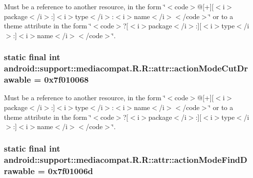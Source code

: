 Must be a reference to another resource, in the form \char`\"{}$<$code$>$@\mbox{[}+\mbox{]}\mbox{[}$<$i$>$package$<$/i$>$:\mbox{]}$<$i$>$type$<$/i$>$:$<$i$>$name$<$/i$>$$<$/code$>$\char`\"{} or to a theme attribute in the form \char`\"{}$<$code$>$?\mbox{[}$<$i$>$package$<$/i$>$:\mbox{]}\mbox{[}$<$i$>$type$<$/i$>$:\mbox{]}$<$i$>$name$<$/i$>$$<$/code$>$\char`\"{}. \hypertarget{classandroid_1_1support_1_1mediacompat_1_1_r_1_1attr_c84b89a7b1f006d64b94f870234ef536}{
\subsubsection[{actionModeCutDrawable}]{\setlength{\rightskip}{0pt plus 5cm}static final int android::support::mediacompat.R.R::attr::actionModeCutDrawable = 0x7f010068}}
\label{classandroid_1_1support_1_1mediacompat_1_1_r_1_1attr_c84b89a7b1f006d64b94f870234ef536}


Must be a reference to another resource, in the form \char`\"{}$<$code$>$@\mbox{[}+\mbox{]}\mbox{[}$<$i$>$package$<$/i$>$:\mbox{]}$<$i$>$type$<$/i$>$:$<$i$>$name$<$/i$>$$<$/code$>$\char`\"{} or to a theme attribute in the form \char`\"{}$<$code$>$?\mbox{[}$<$i$>$package$<$/i$>$:\mbox{]}\mbox{[}$<$i$>$type$<$/i$>$:\mbox{]}$<$i$>$name$<$/i$>$$<$/code$>$\char`\"{}. \hypertarget{classandroid_1_1support_1_1mediacompat_1_1_r_1_1attr_64edbc30b4e2a7a8e3e6337fba3a3924}{
\subsubsection[{actionModeFindDrawable}]{\setlength{\rightskip}{0pt plus 5cm}static final int android::support::mediacompat.R.R::attr::actionModeFindDrawable = 0x7f01006d}}
\label{classandroid_1_1support_1_1mediacompat_1_1_r_1_1attr_64edbc30b4e2a7a8e3e6337fba3a3924}


